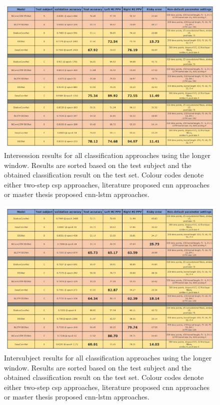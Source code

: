\begin{figure}[ht]
    \centering
    \includegraphics[width=\linewidth]{../images/results/results_intersess_long.pdf}
    \captionsetup{width=\linewidth}
    \captionsetup{justification=centering}
    \caption{Intersession results for all classification approaches using the longer window. Results are sorted based on the test subject and the obtained classification result on the test set. Colour codes denote either two-step \gls{csp} approaches, literature proposed \gls{cnn} approaches or master thesis proposed \gls{cnn}-\gls{lstm} approaches.} 
    \label{fig:results_intersession_long}
\end{figure}

\begin{figure}[ht]
    \centering
    \includegraphics[width=\linewidth]{../images/results/results_intersub_long.pdf}
    \captionsetup{width=\linewidth}
    \captionsetup{justification=centering}
    \caption{Intersubject results for all classification approaches using the longer window. Results are sorted based on the test subject and the obtained classification result on the test set. Colour codes denote either two-step \gls{csp} approaches, literature proposed \gls{cnn} approaches or master thesis proposed \gls{cnn}-\gls{lstm} approaches.} 
    \label{fig:results_intersubject_long}
\end{figure}